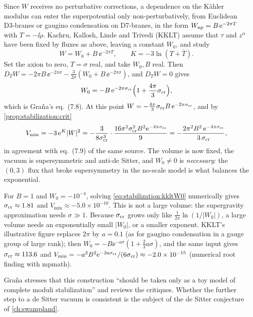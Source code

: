 Since $W$ receives no perturbative corrections, a dependence on the K\"ahler modulus can enter
the superpotential only non-perturbatively, from Euclidean D3-branes or gaugino condensation
on D7-branes, in the form $W_{\rm np}=B\,\mathrm{e}^{-2\pi T}$ with $T=-\ii\rho$.
 Kachru, Kallosh, Linde and Trivedi (KKLT)
assume that $\tau$ and $z^\alpha$ have been fixed by fluxes as above, leaving a constant
$W_0$, and study
\begin{equation}\label{eq:stabilization:kklt}
 W=W_0+B\,\ee^{-2\pi T},\qquad K=-3\ln(T+\bar T).
\end{equation}
 Set the axion to zero, $T=\sigma$ real, and take
$W_0,B$ real. Then $D_TW=-2\pi B\,\ee^{-2\pi\sigma}-\frac{3}{2\sigma}(W_0+B\,\ee^{-2\pi\sigma})$,
and $D_TW=0$ gives
\begin{equation}\label{eq:stabilization:kkltW0}
 W_0=-B\,\mathrm{e}^{-2\pi\sigma_{\rm cr}}\Bigl(1+\frac{4\pi}{3}\sigma_{\rm cr}\Bigr),
\end{equation}
which is Gra\~na's eq.~(7.8). At this point $W=-\tfrac{4\pi}{3}\sigma_{\rm cr}B\,
\mathrm{e}^{-2\pi\sigma_{\rm cr}}$, and by \cref{prop:stabilization:crit}
\begin{equation}\label{eq:stabilization:kkltV}
 V_{\min}=-3\,\mathrm{e}^K|W|^2=-\frac{3}{8\sigma_{\rm cr}^3}\cdot\frac{16\pi^2\sigma_{\rm cr}^2B^2
 \mathrm{e}^{-4\pi\sigma_{\rm cr}}}{9}=-\frac{2\pi^2B^2\,\mathrm{e}^{-4\pi\sigma_{\rm cr}}}{3\,\sigma_{\rm cr}} ,
\end{equation}
in agreement with eq.~(7.9) of the same source.  The volume is now fixed, the vacuum is supersymmetric and anti-de Sitter, and
$W_0\neq0$ is \emph{necessary}: the $(0,3)$ flux that broke supersymmetry in the no-scale model
is what balances the exponential.

\begin{example}\label{ex:stabilization:kkltnum}
For $B=1$ and $W_0=-10^{-4}$, solving \eqref{eq:stabilization:kkltW0} numerically gives
$\sigma_{\rm cr}\approx1.81$ and $V_{\min}\approx-5.0\times10^{-10}$. This is not a large
volume: the supergravity approximation needs $\sigma\gg1$. Because $\sigma_{\rm cr}$ grows
only like $\frac1{2\pi}\ln(1/|W_0|)$, a large volume needs an exponentially small $|W_0|$, or
a smaller exponent. KKLT's illustrative figure replaces $2\pi$ by $a=0.1$ (as for gaugino
condensation in a gauge group of large rank);  then
$W_0=-B\ee^{-a\sigma}(1+\tfrac23a\sigma)$, and the same input gives $\sigma_{\rm cr}\approx113.6$
and $V_{\min}=-a^2B^2\mathrm{e}^{-2a\sigma_{\rm cr}}/(6\sigma_{\rm cr})\approx-2.0\times10^{-15}$
(numerical root finding with mpmath).
\end{example}
Gra\~na stresses that this construction ``should be taken only as a toy model of complete
moduli stabilization'' and reviews the critiques.  Whether
the further step to a de Sitter vacuum is consistent is the subject of the de Sitter
conjecture of \cref{ch:swampland}.

